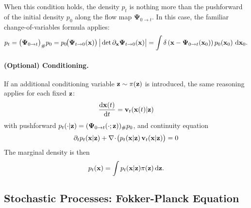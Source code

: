 When this condition holds, the density $p_t$ is nothing more than the pushforward of the initial density $p_0$ along the flow map $\bm{\Psi}_{0\to t}$.  
In this case, the familiar change-of-variables formula applies:
\begin{align*}
    p_t = \big(\bm{\Psi}_{0\to t}\big)_{\#} p_0 
= p_0\!\big(\bm{\Psi}_{t\to 0}({\mathbf{x}})\big)\,
   \big|\det \partial_{\mathbf{x}}\bm{\Psi}_{t\to 0}({\mathbf{x}})\big|
= \int \delta \left({\mathbf{x}} - \bm{\Psi}_{0\to t}({\mathbf{x}}_0)\right) 
   p_0({\mathbf{x}}_0)\,\mathop{}\!\mathrm{d}{\mathbf{x}}_0.
\end{align*}




\paragraph{(Optional) Conditioning.}
If an additional conditioning variable ${\mathbf{z}} \sim \pi({\mathbf{z}})$ is introduced, the same reasoning applies for each fixed ${\mathbf{z}}$:
\[
\frac{\mathop{}\!\mathrm{d} {\mathbf{x}}(t)}{\mathop{}\!\mathrm{d} t}={\mathbf{v}}_t({\mathbf{x}}(t)|{\mathbf{z}})
\]
with pushforward $p_t(\cdot|{\mathbf{z}})=({\bm{\Psi}}_{0\to t}(\cdot;{\mathbf{z}}))_{\#}p_0$, and continuity equation
\[
\partial_t p_t({\mathbf{x}}|{\mathbf{z}})+\nabla\!\cdot\!\big(p_t({\mathbf{x}}|{\mathbf{z}})\,{\mathbf{v}}_t({\mathbf{x}}|{\mathbf{z}})\big)=0
\]
The marginal density is then 
\[
p_t({\mathbf{x}})=\int p_t({\mathbf{x}}|{\mathbf{z}})\pi({\mathbf{z}})\mathop{}\!\mathrm{d}{\mathbf{z}}.
\]









\subsection{Stochastic Processes: Fokker-Planck Equation}\label{subsec:cov-fpe}

